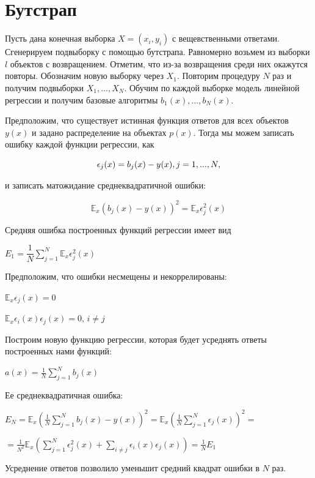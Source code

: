 \documentclass{article}
\theoremstyle{definition}
\theoremstyle{theorem}
\theoremstyle{remark}
\theoremstyle{theorem}
\theoremstyle{example}
\theoremstyle{theorem}
\theoremstyle{theorem}
\theoremstyle{theorem}
\theoremstyle{theorem}
\begin{document}
\newpage

\section{Бутстрап}

Пусть дана конечная выборка $X = (x_i,y_i)$ с вещевственными ответами. Сгенерируем подвыборку с помощью бутстрапа. Равномерно возьмем из выборки $l$ объектов с возвращением. Отметим, что из-за возвращения среди них окажутся повторы. Обозначим новую выборку через $X_1$. Повторим процедуру $N$ раз и получим подвыборки $X_1,\ldots,X_N$. Обучим по каждой выборке модель линейной регрессии и получим базовые алгоритмы $b_1(x),\ldots,b_N(x)$.

Предположим, что существует истинная функция ответов для всех объектов $y(x)$ и задано распределение на объектах $p(x)$. Тогда мы можем записать ошибку каждой функции регрессии, как 

\begin{equation}
	\epsilon_j(x)=b_j(x)-y(x),\space j = 1,...,N,
\end{equation}

и записать матожидание среднеквадратичной ошибки:

\begin{equation}
	\mathbb{E}_x\left(b_j(x) - y(x)\right)^2 = \mathbb{E}_x\epsilon^2_j(x)
\end{equation}

Средняя ошибка построенных функций регрессии имеет вид

$E_1= \dfrac{1}{N}\sum_{j=1}^{N}\mathbb{E}_x\epsilon^2_j(x)$

Предположим, что ошибки несмещены и некоррелированы:

$\mathbb{E}_x\epsilon_j(x) = 0$

$ \mathbb{E}_x\epsilon_i(x)\epsilon_j(x) = 0$,  $i\neq j$

Построим  новую функцию регрессии, которая будет усреднять ответы построенных нами функций:

$a(x) = \frac{1}{N}\sum_{j=1}^{N}b_j(x)$

Ее среднеквадратичная ошибка:

$E_N = \mathbb{E}_x\left(\frac{1}{N}\sum_{j=1}^{N}b_j(x)-y(x)\right)^2 = \mathbb{E}_x\left(\frac{1}{N}\sum_{j=1}^{N}\epsilon_j(x)\right)^2 = $

$=\frac{1}{N^2}\mathbb{E}_x\left(\sum_{j=1}^{N}\epsilon^2_j(x) + \sum_{i\neq j}^{}\epsilon_i(x)\epsilon_j(x)\right)=\frac{1}{N}E_1$

Усреднение ответов позволило уменьшит средний квадрат ошибки в $N$ раз.
\end{document}
